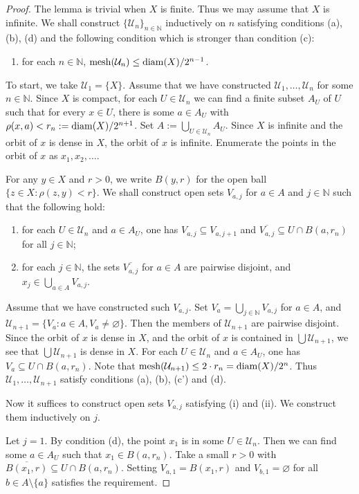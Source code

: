 \documentclass[11pt]{amsart}
\theoremstyle{definition}
\numberwithin{equation}{section}
\theoremstyle{definition}
\newcommand{\cU}{{\mathcal U}}
\newcommand{\Nb}{{\mathbb N}}
\newcommand{\diam}{{\rm diam}}
\newcommand{\mesh}{{\rm mesh}}
\begin{document}
\begin{proof} The lemma is trivial when $X$ is finite. Thus we may assume that $X$ is infinite. We shall construct $\{\cU_n\}_{n\in \Nb}$ inductively on $n$ satisfying conditions (a), (b), (d) and the following condition which is stronger than condition (c):
\begin{enumerate}
\item[(c')] for each $n\in \Nb$,  ${\rm mesh}(\cU_n)\le \diam(X)/2^{n-1}$. 
\end{enumerate}

To start, we take $\cU_1=\{X\}$. Assume that we have constructed $\cU_1, \dots, \cU_n$ for some $n\in \Nb$. Since $X$ is compact, for each $U\in \cU_n$ we can find a finite subset $A_U$ of $U$ such that for every $x\in U$, there is some $a\in A_U$ with $\rho(x, a)<r_n:=\diam(X)/2^{n+1}$. Set $A:=\bigcup_{U\in \cU_n}A_U$. Since $X$ is infinite and the orbit of $x$ is dense in $X$, the orbit of $x$ is infinite. Enumerate the points in the orbit of $x$ as $x_1, x_2, \dots$. 

For any $y\in X$ and $r>0$, we write $B(y, r)$ for the open ball $\{z\in X: \rho(z, y)<r\}$. 
We shall construct open sets $V_{a, j}$ for  $a\in A$ and $j\in \Nb$ such that the following hold:
\begin{enumerate}
\item[(i)] for each $U\in \cU_n$ and $a\in A_U$, one has $V_{a, j}\subseteq V_{a, j+1}$ and $\overline{V_{a, j}}\subseteq U\cap B(a, r_n)$ for all $j\in \Nb$;
\item[(ii)] for each $j\in \Nb$, the sets $\overline{V_{a, j}}$ for $a\in A$ are pairwise disjoint, and $x_j\in \bigcup_{a\in A} V_{a, j}$. 
\end{enumerate}
Assume that we have constructed such $V_{a, j}$. Set $V_a=\bigcup_{j\in \Nb}V_{a, j}$ for $a\in A$, and $\cU_{n+1}=\{V_a: a\in A, V_a\neq \varnothing\}$. Then the members of $\cU_{n+1}$ are pairwise disjoint. Since the orbit of $x$ is dense in $X$, and the orbit of $x$ is contained in $\bigcup \cU_{n+1}$, we see that $\bigcup \cU_{n+1}$ is dense in $X$. For each $U\in \cU_n$ and $a\in A_U$, one has $V_a\subseteq U\cap B(a, r_n)$. Note that $\mesh(\cU_{n+1})\le 2\cdot r_n=\diam(X)/2^n$. Thus $\cU_1, \dots, \cU_{n+1}$ satisfy conditions (a), (b), (c') and (d).

Now it suffices to construct open sets $V_{a, j}$ satisfying (i) and (ii). We construct them inductively on $j$. 

Let $j=1$. By condition (d), the point $x_1$ is in some $U\in \cU_n$. Then we can find some $a\in A_U$ such that $x_1\in B(a, r_n)$. Take a small $r>0$ with $\overline{B(x_1, r)}\subseteq U\cap B(a, r_n)$. Setting $V_{a, 1}=B(x_1, r)$ and $V_{b, 1}=\varnothing$ for all $b\in A\setminus \{a\}$ satisfies the requirement. 


\end{proof}
\end{document}
